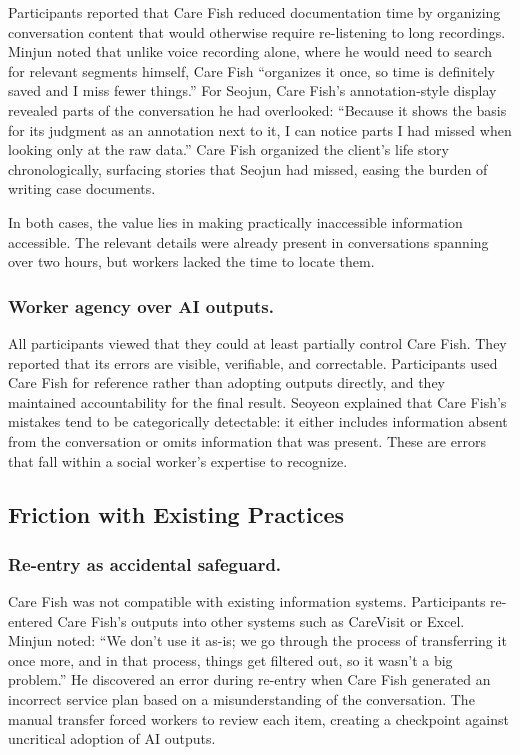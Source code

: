 \documentclass{article}
\begin{document}
Participants reported that Care Fish reduced documentation time by organizing conversation content that would otherwise require re-listening to long recordings. Minjun noted that unlike voice recording alone, where he would need to search for relevant segments himself, Care Fish ``organizes it once, so time is definitely saved and I miss fewer things.'' For Seojun, Care Fish's annotation-style display revealed parts of the conversation he had overlooked: ``Because it shows the basis for its judgment as an annotation next to it, I can notice parts I had missed when looking only at the raw data.'' Care Fish organized the client's life story chronologically, surfacing stories that Seojun had missed, easing the burden of writing case documents.

In both cases, the value lies in making practically inaccessible information accessible. The relevant details were already present in conversations spanning over two hours, but workers lacked the time to locate them.

\subsubsection{Worker agency over AI outputs.}

All participants viewed that they could at least partially control Care Fish. They reported that its errors are visible, verifiable, and correctable. Participants used Care Fish for reference rather than adopting outputs directly, and they maintained accountability for the final result. Seoyeon explained that Care Fish's mistakes tend to be categorically detectable: it either includes information absent from the conversation or omits information that was present. These are errors that fall within a social worker's expertise to recognize.

\subsection{Friction with Existing Practices}

\subsubsection{Re-entry as accidental safeguard.}

Care Fish was not compatible with existing information systems. Participants re-entered Care Fish's outputs into other systems such as CareVisit or Excel. Minjun noted: ``We don't use it as-is; we go through the process of transferring it once more, and in that process, things get filtered out, so it wasn't a big problem.'' He discovered an error during re-entry when Care Fish generated an incorrect service plan based on a misunderstanding of the conversation. The manual transfer forced workers to review each item, creating a checkpoint against uncritical adoption of AI outputs.
\end{document}
